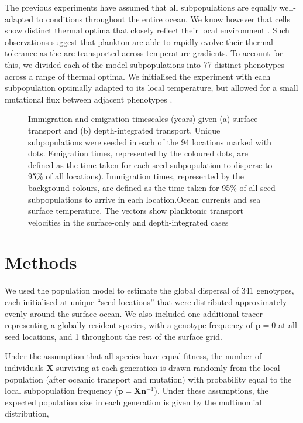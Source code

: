 \documentclass[12pt]{article}
\begin{document}
The previous experiments have assumed that all subpopulations are equally well-adapted to conditions throughout the entire ocean. We know however that cells show distinct thermal optima that closely reflect their local environment \citep{Thomas:2012}. Such observations suggest that plankton are able to rapidly evolve their thermal tolerance as the are transported across temperature gradients. To account for this, we divided each of the model subpopulations into 77 distinct phenotypes across a range of thermal optima. We initialised the experiment with each subpopulation optimally adapted to its local temperature, but allowed for a small mutational flux between adjacent phenotypes \citep{Beckman:2019}.


\begin{figure}[t!]
    \centering
    \caption{Immigration and emigration timescales (years) given (a) surface transport and (b) depth-integrated transport. Unique subpopulations were seeded in each of the 94 locations marked with dots. Emigration times, represented by the coloured dots, are defined as the time taken for each seed subpopulation to disperse to 95\% of all locations). Immigration times, represented by the background colours, are defined as the time taken for 95\% of all seed subpopulations to arrive in each location.Ocean currents and sea surface temperature. The vectors show planktonic transport velocities in the surface-only and depth-integrated cases}
\label{Imm_vs_em}
\end{figure}







\section{Methods}


We used the population model to estimate the global dispersal of 341 genotypes, each initialised at unique ``seed locations'' that were distributed approximately evenly around the surface ocean. We also included one additional tracer representing a globally resident species, with a genotype frequency of $\mathbf{p} = 0$ at all seed locations, and 1 throughout the rest of the surface grid.

Under the assumption that all species have equal fitness, the number of individuals $\mathbf{X}$ surviving at each generation is drawn randomly from the local population (after oceanic transport and mutation) with probability equal to the local subpopulation frequency ($\mathbf{p} = \mathbf{X} \mathbf{n}^{-1}$). Under these assumptions, the expected population size in each generation is given by the multinomial distribution, 
\end{document}
